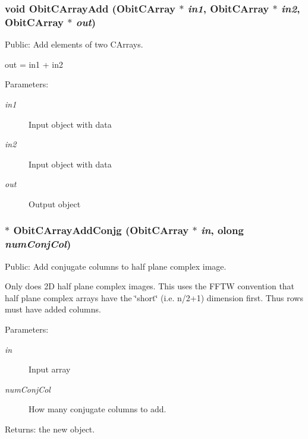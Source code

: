 \subsubsection{\setlength{\rightskip}{0pt plus 5cm}void Obit\-CArray\-Add ({\bf Obit\-CArray} $\ast$ {\em in1}, {\bf Obit\-CArray} $\ast$ {\em in2}, {\bf Obit\-CArray} $\ast$ {\em out})}\label{ObitCArray_8h_a52}


Public: Add elements of two CArrays. 

out = in1 + in2 \begin{Desc}
\item[Parameters:]
\begin{description}
\item[{\em in1}]Input object with data \item[{\em in2}]Input object with data \item[{\em out}]Output object \end{description}
\end{Desc}
\subsubsection{$\ast$ Obit\-CArray\-Add\-Conjg ({\bf Obit\-CArray} $\ast$ {\em in}, {\bf olong} {\em num\-Conj\-Col})}\label{ObitCArray_8h_a70}


Public: Add conjugate columns to half plane complex image. 

Only does 2D half plane complex images. This uses the FFTW convention that half plane complex arrays have the \char`\"{}short\char`\"{} (i.e. n/2+1) dimension first. Thus rows must have added columns. \begin{Desc}
\item[Parameters:]
\begin{description}
\item[{\em in}]Input array \item[{\em num\-Conj\-Col}]How many conjugate columns to add. \end{description}
\end{Desc}
\begin{Desc}
\item[Returns:]the new object. \end{Desc}
